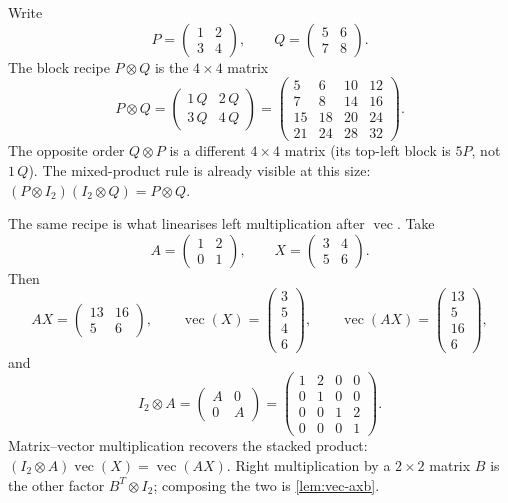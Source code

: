 \documentclass[11pt,a4paper]{article}
\begin{document}
\begin{example}
\label{ex:kronecker}
Write
\[
P
=
\begin{pmatrix}
1 & 2 \\
3 & 4
\end{pmatrix},
\qquad
Q
=
\begin{pmatrix}
5 & 6 \\
7 & 8
\end{pmatrix}.
\]
The block recipe \(P\otimes Q\) is the \(4\times 4\) matrix
\[
P\otimes Q
=
\begin{pmatrix}
1\,Q & 2\,Q \\
3\,Q & 4\,Q
\end{pmatrix}
=
\begin{pmatrix}
5 & 6 & 10 & 12 \\
7 & 8 & 14 & 16 \\
15 & 18 & 20 & 24 \\
21 & 24 & 28 & 32
\end{pmatrix}.
\]
The opposite order \(Q\otimes P\) is a different \(4\times 4\) matrix (its top-left block is \(5P\), not \(1\,Q\)). The mixed-product rule is already visible at this size: \((P\otimes I_{2})(I_{2}\otimes Q)=P\otimes Q\).

The same recipe is what linearises left multiplication after \(\operatorname{vec}\). Take
\[
A
=
\begin{pmatrix}
1 & 2 \\
0 & 1
\end{pmatrix},
\qquad
X
=
\begin{pmatrix}
3 & 4 \\
5 & 6
\end{pmatrix}.
\]
Then
\[
AX
=
\begin{pmatrix}
13 & 16 \\
5 & 6
\end{pmatrix},
\qquad
\operatorname{vec}(X)
=
\begin{pmatrix}
3 \\ 5 \\ 4 \\ 6
\end{pmatrix},
\qquad
\operatorname{vec}(AX)
=
\begin{pmatrix}
13 \\ 5 \\ 16 \\ 6
\end{pmatrix},
\]
and
\[
I_{2}\otimes A
=
\begin{pmatrix}
A & 0 \\
0 & A
\end{pmatrix}
=
\begin{pmatrix}
1 & 2 & 0 & 0 \\
0 & 1 & 0 & 0 \\
0 & 0 & 1 & 2 \\
0 & 0 & 0 & 1
\end{pmatrix}.
\]
Matrix--vector multiplication recovers the stacked product: \((I_{2}\otimes A)\operatorname{vec}(X)=\operatorname{vec}(AX)\). Right multiplication by a \(2\times 2\) matrix \(B\) is the other factor \(B^{T}\otimes I_{2}\); composing the two is \cref{lem:vec-axb}.
\end{example}
\end{document}
